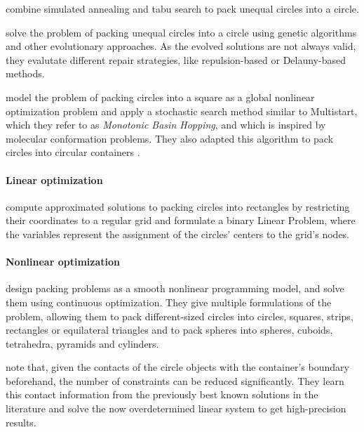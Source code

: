 \documentclass[a4paper,style=print,bibliography=totoc,nexus,lnum,extramargin]{tubsbook}
\begin{document}
\textcite{ZD2005effective} combine simulated annealing and tabu search to pack unequal circles into a circle.

\textcite{FMC2015evolutionary} solve the problem of packing unequal circles into a circle using genetic algorithms and other evolutionary approaches. As the evolved solutions are not always valid, they evalutate different repair strategies, like repulsion-based or Delauny-based methods.

\textcite{ALS2008disk} model the problem of packing circles into a square as a global nonlinear optimization problem and apply a stochastic search method similar to Multistart, which they refer to as \emph{Monotonic Basin Hopping}, and which is inspired by molecular conformation problems. They also adapted this algorithm to pack circles into circular containers \cite{GJLS2009solving}.

\paragraph{Linear optimization}

\textcite{LIE2014approximate} compute approximated solutions to packing circles into rectangles by restricting their coordinates to a regular grid and formulate a binary Linear Problem, where the variables represent the assignment of the circles' centers to the grid's nodes.


\paragraph{Nonlinear optimization}

\textcite{BS2008minimizing} design packing problems as a smooth nonlinear programming model, and solve them using continuous optimization. They give multiple formulations of the problem, allowing them to pack different-sized circles into circles, squares, strips, rectangles or equilateral triangles and to pack spheres into spheres, cuboids, tetrahedra, pyramids and cylinders.

\textcite{BG2010new} note that, given the contacts of the circle objects with the container's boundary beforehand, the number of constraints can be reduced significantly. They learn this contact information from the previously best known solutions in the literature and solve the now overdetermined linear system to get high-precision results.
\end{document}
